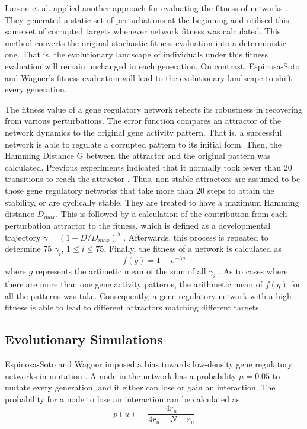 Larson et al. applied another approach for evaluating the fitness of networks \cite{larson2016recombination}. They generated a static set of perturbations at the beginning and utilised this same set of corrupted targets whenever network fitness was calculated. This method converts the original stochastic fitness evaluation into a deterministic one. That is, the evolutionary landscape of individuals under this fitness evaluation will remain unchanged in each generation. On contrast, Espinosa-Soto and Wagner's fitness evaluation will lead to the evolutionary landscape to shift every generation. 

The fitness value of a gene regulatory network reflects its robustness in recovering from various perturbations. The error function compares an attractor of the network dynamics to the original gene activity pattern. That is, a successful network is able to regulate a corrupted pattern to its initial form. Then, the Hamming Distance G between the attractor and the original pattern was calculated. Previous experiments indicated that it normally took fewer than 20 transitions to reach the attractor \cite{wagner1996does}. Thus, non-stable attractors are assumed to be those gene regulatory networks that take more than 20 steps to attain the stability, or are cyclically stable. They are treated to have a maximum Hamming distance $D_{max}$. This is followed by a calculation of the contribution from each perturbation attractor to the fitness, which is defined as a developmental trajectory $\gamma=(1-D/D_{max})^5$ \cite{espinosa2010specialization}. Afterwards, this process is repeated to determine 75 $\gamma_{i}$, $1 \leq i \leq 75$. Finally, the fitness of a network is calculated as
\begin{equation}
f(g)=1-e^{-3g}
\end{equation}
where $g$ represents the artimetic mean of the sum of all $\gamma_{i}$ \cite{espinosa2010specialization}. As to cases where there are more than one gene activity patterns, the arithmetic mean of $f(g)$ for all the patterns was take. Consequently, a gene regulatory network with a high fitness is able to lead to different attractors matching different targets. 

\subsection{Evolutionary Simulations}
Espinosa-Soto and Wagner imposed a bias towards low-density gene regulatory networks in mutation \cite{espinosa2010specialization}. A node in the network has a probability $\mu=0.05$ to mutate every generation, and it either can lose or gain an interaction. The probability for a node to lose an interaction can be calculated as
\begin{equation}
p(u)=\frac{4r_{u}}{4r_{u} + N - r_{u}}
\end{equation}

